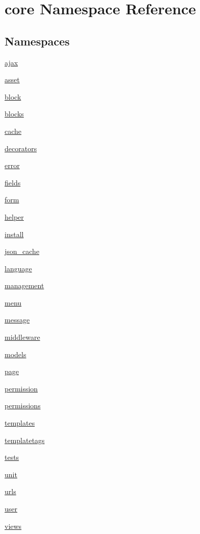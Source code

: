 \hypertarget{namespacecore}{\section{core Namespace Reference}
\label{namespacecore}
}
\subsection*{Namespaces}
\begin{DoxyCompactItemize}
\item 
\hyperlink{namespacecore_1_1ajax}{ajax}
\item 
\hyperlink{namespacecore_1_1asset}{asset}
\item 
\hyperlink{namespacecore_1_1block}{block}
\item 
\hyperlink{namespacecore_1_1blocks}{blocks}
\item 
\hyperlink{namespacecore_1_1cache}{cache}
\item 
\hyperlink{namespacecore_1_1decorators}{decorators}
\item 
\hyperlink{namespacecore_1_1error}{error}
\item 
\hyperlink{namespacecore_1_1fields}{fields}
\item 
\hyperlink{namespacecore_1_1form}{form}
\item 
\hyperlink{namespacecore_1_1helper}{helper}
\item 
\hyperlink{namespacecore_1_1install}{install}
\item 
\hyperlink{namespacecore_1_1json__cache}{json\-\_\-cache}
\item 
\hyperlink{namespacecore_1_1language}{language}
\item 
\hyperlink{namespacecore_1_1management}{management}
\item 
\hyperlink{namespacecore_1_1menu}{menu}
\item 
\hyperlink{namespacecore_1_1message}{message}
\item 
\hyperlink{namespacecore_1_1middleware}{middleware}
\item 
\hyperlink{namespacecore_1_1models}{models}
\item 
\hyperlink{namespacecore_1_1page}{page}
\item 
\hyperlink{namespacecore_1_1permission}{permission}
\item 
\hyperlink{namespacecore_1_1permissions}{permissions}
\item 
\hyperlink{namespacecore_1_1templates}{templates}
\item 
\hyperlink{namespacecore_1_1templatetags}{templatetags}
\item 
\hyperlink{namespacecore_1_1tests}{tests}
\item 
\hyperlink{namespacecore_1_1unit}{unit}
\item 
\hyperlink{namespacecore_1_1urls}{urls}
\item 
\hyperlink{namespacecore_1_1user}{user}
\item 
\hyperlink{namespacecore_1_1views}{views}
\end{DoxyCompactItemize}
